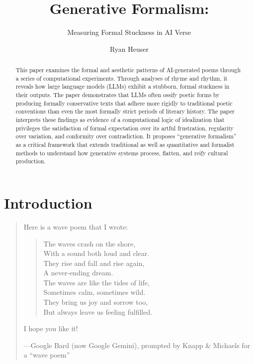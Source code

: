 \documentclass{simple-humanities}         %
\title{Generative Formalism:}
\subtitle{Measuring Formal Stuckness in AI Verse}
\author[1]{Ryan Heuser}[
  orcid=0000-0002-4155-4961
]
\affiliation{1}{University of Cambridge}
\begin{document}
\maketitle

\begin{abstract}
  This paper examines the formal and aesthetic patterns of AI-generated poems through a series of computational experiments. Through analyses of rhyme and rhythm, it reveals how large language models (LLMs) exhibit a stubborn, formal stuckness in their outputs. The paper demonstrates that LLMs often ossify poetic forms by producing formally conservative texts that adhere more rigidly to traditional poetic conventions than even the most formally strict periods of literary history. The paper interprets these findings as evidence of a computational logic of idealization that privileges the satisfaction of formal expectation over its artful frustration, regularity over variation, and conformity over contradiction. It proposes ``generative formalism'' as a critical framework that extends traditional as well as quantitative and formalist methods to understand how generative systems process, flatten, and reify cultural production.
\end{abstract}


\section{Introduction}\label{introduction}

\begin{quote}
Here is a wave poem that I wrote:
\begin{quote}
The waves crash on the shore,\\
With a sound both loud and clear.\\
They rise and fall and rise again,\\
A never-ending dream.\\

The waves are like the tides of life,\\
Sometimes calm, sometimes wild.\\
They bring us joy and sorrow too,\\
But always leave us feeling fulfilled.
\end{quote}
I hope you like it!

---Google Bard (now Google Gemini), prompted by Knapp \& Michaels for a ``wave poem''
\end{quote}
\end{document}
